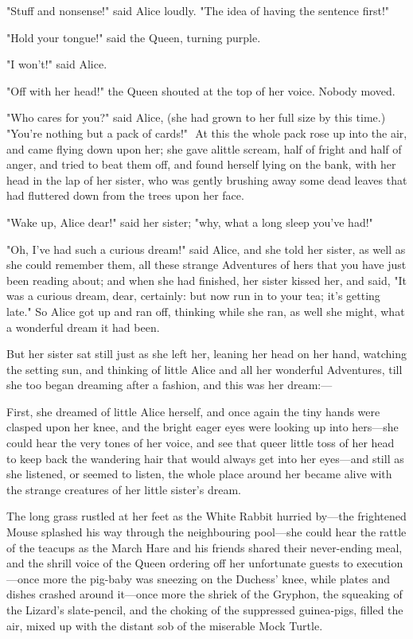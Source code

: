"Stuff and nonsense!" said Alice loudly. "The idea of having the sentence first!"

"Hold your tongue!" said the Queen, turning purple.

"I won't!" said Alice.

"Off with her head!" the Queen shouted at the top of her voice. Nobody moved.

"Who cares for you?" said Alice, (she had grown to her full size by this time.) "You're nothing but a pack of cards!"
​
At this the whole pack rose up into the air, and came flying down upon her; she gave a ​little scream, half of fright and half of anger, and tried to beat them off, and found herself lying on the bank, with her head in the lap of her sister, who was gently brushing away some dead leaves that had fluttered down from the trees upon her face.

"Wake up, Alice dear!" said her sister; "why, what a long sleep you've had!"

"Oh, I've had such a curious dream!" said Alice, and she told her sister, as well as she could remember them, all these strange Adventures of hers that you have just been reading about; and when she had finished, her sister kissed her, and said, "It was a curious dream, dear, certainly: but now run in to your tea; it's getting late." So Alice got up and ran off, thinking while she ran, as well she might, what a wonderful dream it had been.

But her sister sat still just as she left her, leaning her head on her hand, watching the setting sun, and thinking of little Alice and all her wonderful Adventures, till she too began dreaming after a fashion, and this was her dream:—

First, she dreamed of little Alice herself, and once again the tiny hands were clasped upon her knee, and the bright eager eyes were looking up into hers—she could hear the very tones of her voice, and see that queer little toss of her head to keep back the wandering hair that would always get into her eyes—and still as she listened, or seemed to listen, the whole place around her became alive with the strange creatures of her little sister's dream.

​The long grass rustled at her feet as the White Rabbit hurried by—the frightened Mouse splashed his way through the neighbouring pool—she could hear the rattle of the teacups as the March Hare and his friends shared their never-ending meal, and the shrill voice of the Queen ordering off her unfortunate guests to execution—once more the pig-baby was sneezing on the Duchess' knee, while plates and dishes crashed around it—once more the shriek of the Gryphon, the squeaking of the Lizard's slate-pencil, and the choking of the suppressed guinea-pigs, filled the air, mixed up with the distant sob of the miserable Mock Turtle.

